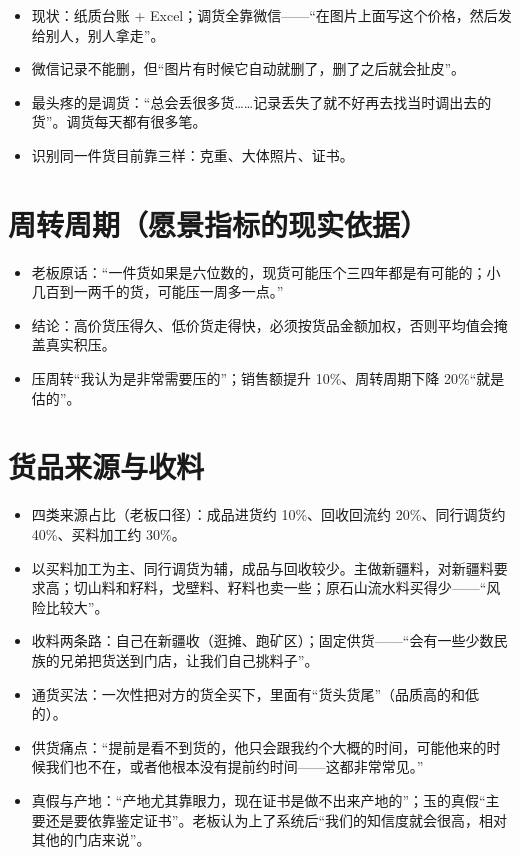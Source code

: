 \documentclass[12pt, a4paper]{ctexart}
\begin{document}
\begin{itemize}[leftmargin=1.6em, itemsep=2pt]
  \item 现状：纸质台账 + Excel；调货全靠微信——“在图片上面写这个价格，然后发给别人，别人拿走”。
  \item 微信记录不能删，但“图片有时候它自动就删了，删了之后就会扯皮”。
  \item 最头疼的是调货：“总会丢很多货……记录丢失了就不好再去找当时调出去的货”。调货每天都有很多笔。
  \item 识别同一件货目前靠三样：克重、大体照片、证书。
\end{itemize}

\section{周转周期（愿景指标的现实依据）}

\begin{itemize}[leftmargin=1.6em, itemsep=2pt]
  \item 老板原话：“一件货如果是六位数的，现货可能压个三四年都是有可能的；小几百到一两千的货，可能压一周多一点。”
  \item 结论：高价货压得久、低价货走得快，必须按货品金额加权，否则平均值会掩盖真实积压。
  \item 压周转“我认为是非常需要压的”；销售额提升 10\%、周转周期下降 20\%“就是估的”。
\end{itemize}

\section{货品来源与收料}

\begin{itemize}[leftmargin=1.6em, itemsep=2pt]
  \item 四类来源占比（老板口径）：成品进货约 10\%、回收回流约 20\%、同行调货约 40\%、买料加工约 30\%。
  \item 以买料加工为主、同行调货为辅，成品与回收较少。主做新疆料，对新疆料要求高；切山料和籽料，戈壁料、籽料也卖一些；原石山流水料买得少——“风险比较大”。
  \item 收料两条路：自己在新疆收（逛摊、跑矿区）；固定供货——“会有一些少数民族的兄弟把货送到门店，让我们自己挑料子”。
  \item 通货买法：一次性把对方的货全买下，里面有“货头货尾”（品质高的和低的）。
  \item 供货痛点：“提前是看不到货的，他只会跟我约个大概的时间，可能他来的时候我们也不在，或者他根本没有提前约时间——这都非常常见。”
  \item 真假与产地：“产地尤其靠眼力，现在证书是做不出来产地的”；玉的真假“主要还是要依靠鉴定证书”。老板认为上了系统后“我们的知信度就会很高，相对其他的门店来说”。
\end{itemize}
\end{document}
